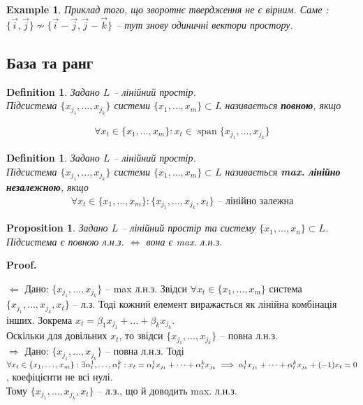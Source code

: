 \documentclass[a4paper, 10pt]{article}
\makeatletter
\def\rightproof{$\boxed{\Rightarrow}$ }
\def\leftproof{$\boxed{\Leftarrow}$ }
\theoremstyle{theoremdd}
\newtheorem{definition}[theorem]{Definition}
\newtheorem{example}[theorem]{Example}
\newtheorem{proposition}[theorem]{Proposition}
\DeclareMathOperator{\linspan}{span}
\renewenvironment{proof}[1][Proof.\\]{\par
\pushQED{\hfill \qed}%
\normalfont \topsep6\p@\@plus6\p@\relax
\trivlist
\item\relax
{\bfseries
#1\@addpunct{.}}\hspace\labelsep\ignorespaces
}{%
\popQED\endtrivlist\@endpefalse
}
\makeatother
\begin{document}
	\begin{example}
	Приклад того, що зворотнє твердження не є вірним. Саме :\\
	$\{\vec{i},\vec{j}\} \not\sim \{\vec{i}-\vec{j}, \vec{j}-\vec{k}\}$ -- тут знову одиничні вектори простору.
	\end{example}
	
	\subsection{База та ранг}
	\begin{definition}
	Задано $L$ -- лінійний простір.\\
	Підсистема $\{x_{j_1}, \dots, x_{j_k}\}$ системи $\{x_1, \dots, x_m\} \subset L$ називається \textbf{повною}, якщо
	\iffalse
	\begin{align*}
	\forall x_t \in \{x_1, \dots, x_m\}: \exists \alpha^1_t, \dots, \alpha^k_t: x_t = \alpha^1_t x_{j_1} + \dots + \alpha^k_t x_{j_k}
	\end{align*}
	\fi
	\begin{align*}
	\forall x_t \in \{x_1,\dots,x_m\}: x_t \in \linspan\{x_{j_1},\dots,x_{j_k}\}
	\end{align*}
	\end{definition}
	
	\begin{definition}
	Задано $L$ -- лінійний простір.\\
	Підсистема $\{x_{j_1}, \dots, x_{j_k}\}$ системи $\{x_1, \dots, x_m\} \subset L$ називається \textbf{max. лінійно незалежною}, якщо
	\begin{align*}
	\forall x_t \in \{x_1, \dots, x_m\}: \{x_{j_1}, \dots, x_{j_k}, x_t\} \textrm{ -- лінійно залежна}
	\end{align*}
	\end{definition}
	
	\begin{proposition}
	Задано $L$ -- лінійний простір та систему $\{x_1,\dots,x_n\} \subset L$.\\
	Підсистема є повною л.н.з. $\iff$ вона є max. л.н.з.
	\end{proposition}
	
	\begin{proof}
	\leftproof Дано: $\{x_{j_1}, \dots, x_{j_k}\}$ -- max л.н.з. Звідси $\forall x_t \in \{x_1, \dots, x_m \}$ система $\{x_{j_1}, \dots, x_{j_k}, x_t\}$ -- л.з. Тоді кожний елемент виражається як лінійна комбінація інших. Зокрема $x_t = \beta_1 x_{j_1} + \dots + \beta_k x_{j_k}$.\\
	Оскільки для довільних $x_t$, то звідси $\{x_{j_1},\dots, x_{j_k}\}$ -- повна л.н.з.
	\bigskip \\
	\rightproof Дано: $\{x_{j_1}, \dots, x_{j_k}\}$ -- повна л.н.з. Тоді $\forall x_t \in \{x_1, \dots, x_m\}: \exists \alpha^1_t, \dots, \alpha^k_t: \\ x_t = \alpha^1_t x_{j_1} + \dots + \alpha^k_t x_{j_k} \implies \alpha^1_t x_{j_1} + \dots + \alpha^k_t x_{j_k} + (-1)x_t = 0$, коефіцієнти не всі нулі.\\
	Тому $\{x_{j_1}, \dots, x_{j_k}, x_t\}$ -- л.з., що й доводить max. л.н.з.
	\end{proof}
	
\end{document}
